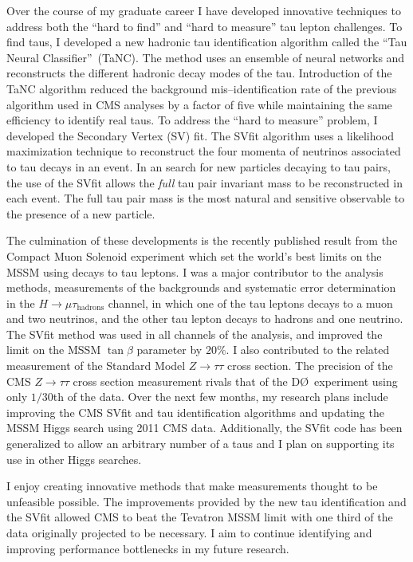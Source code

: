 \documentclass{scrartcl}        %
\begin{document}
\begin{cv}{}
Over the course of my graduate career I have developed innovative techniques to
address both the ``hard to find'' and ``hard to measure'' tau lepton
challenges.  To find taus, I developed a new hadronic tau identification
algorithm called the ``Tau Neural Classifier''~(TaNC).  The method uses an ensemble of
neural networks and reconstructs the different hadronic decay modes of the tau.
Introduction of the TaNC algorithm reduced the background mis--identification
rate of the previous algorithm used in CMS analyses by a factor of five while
maintaining the same efficiency to identify real taus.  To address the ``hard to
measure'' problem, I developed the Secondary Vertex (SV) fit.  The SVfit
algorithm uses a likelihood maximization technique to reconstruct the four
momenta of neutrinos associated to tau decays in an event.  In an search for
new particles decaying to tau pairs, the use of the SVfit allows the
\emph{full} tau pair invariant mass to be reconstructed in each event. The
full tau pair mass is the most natural and sensitive observable to the
presence of a new particle.

The culmination of these developments is the recently published result from the
Compact Muon Solenoid experiment which set the world's best limits on the MSSM
using decays to tau leptons.  I was a major contributor to the analysis methods,
measurements of the backgrounds and systematic error determination in the $H \to
\mu \tau_{\mathrm{hadrons}}$ channel, in which one of the tau leptons decays to a
muon and two neutrinos, and the other tau lepton decays to hadrons and one
neutrino.  The SVfit method was used in all channels of the analysis, and
improved the limit on the MSSM $\tan\beta$ parameter by $20\%$.  I also
contributed to the related measurement of the Standard Model
$Z\to\tau\tau$ cross section. The precision of the CMS $Z\to\tau\tau$ cross
section measurement rivals that of the D\O~experiment using only $1/30$th of the
data.  Over the next few months, my research plans include improving the CMS
SVfit and tau identification algorithms and updating the MSSM Higgs search using
2011 CMS data.  Additionally, the SVfit code has been generalized to allow an
arbitrary number of a taus and I plan on supporting its use in other Higgs
searches.  

I enjoy creating innovative methods that make measurements thought to be
unfeasible possible.  The improvements provided by the new tau identification
and the SVfit allowed CMS to beat the Tevatron MSSM limit with one third of the
data originally projected to be necessary. I aim to continue identifying and
improving performance bottlenecks in my future research.


\end{cv}
\end{document}
